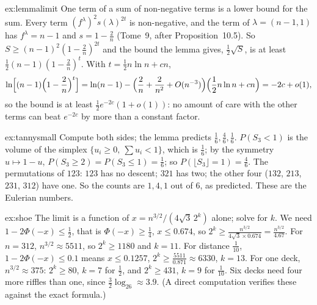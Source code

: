 \begin{solution}{ex:lemmalimit}
\idea One term of a sum of non-negative terms is a lower bound for the sum.
\writeup Every term $(f^\lambda)^2s(\lambda)^{2t}$ is non-negative, and the term of $\lambda=(n-1,1)$ has $f^\lambda=n-1$ and $s=1-\frac2n$ (Tome~9, after Proposition~10.5). So $S\ge(n-1)^2(1-\frac2n)^{2t}$ and the bound
the lemma gives, $\frac12\sqrt S$, is at least $\frac12(n-1)(1-\frac2n)^t$. With $t=\frac12n\ln n+cn$,
\[
\ln\Bigl[(n-1)\Bigl(1-\frac2n\Bigr)^t\Bigr]=\ln(n-1)-\Bigl(\frac2n+\frac2{n^2}+O(n^{-3})\Bigr)\Bigl(\frac12n\ln n+cn\Bigr)=-2c+o(1),
\]
so the bound is at least $\frac12e^{-2c}(1+o(1))$: no amount of care with the other terms can beat $e^{-2c}$ by more than a constant factor.
\end{solution}

\begin{solution}{ex:tannysmall}
\idea Compute both sides; the lemma predicts $\frac16,\frac46,\frac16$.
\writeup $P(S_3<1)$ is the volume of the simplex $\{u_i\ge0,\ \sum u_i<1\}$, which is $\frac16$; by the symmetry $u\mapsto1-u$, $P(S_3\ge2)=P(S_3\le1)=\frac16$; so $P(\lfloor S_3\rfloor=1)=\frac46$. The permutations
of $123$: $123$ has no descent; $321$ has two; the other four ($132$, $213$, $231$, $312$) have one. So the counts are $1,4,1$ out of $6$, as predicted. These are the Eulerian numbers.
\end{solution}

\begin{solution}{ex:shoe}
\idea The limit is a function of $x=n^{3/2}/(4\sqrt3\,2^k)$ alone; solve for $k$.
\writeup We need $1-2\Phi(-x)\le\frac12$, that is $\Phi(-x)\ge\frac14$, $x\le0.674$, so $2^k\ge\frac{n^{3/2}}{4\sqrt3\times0.674}=\frac{n^{3/2}}{4.67}$. For $n=312$, $n^{3/2}\approx5511$, so $2^k\ge1180$ and $k=11$. For
distance $\frac1{10}$, $1-2\Phi(-x)\le0.1$ means $x\le0.1257$, $2^k\ge\frac{5511}{0.871}\approx6330$, $k=13$. For one deck, $n^{3/2}\approx375$: $2^k\ge80$, $k=7$ for $\frac12$, and $2^k\ge431$, $k=9$ for $\frac1{10}$. Six decks need four more riffles
than one, since $\frac32\log_26\approx3.9$. (A direct computation verifies these against the exact formula.)
\end{solution}

